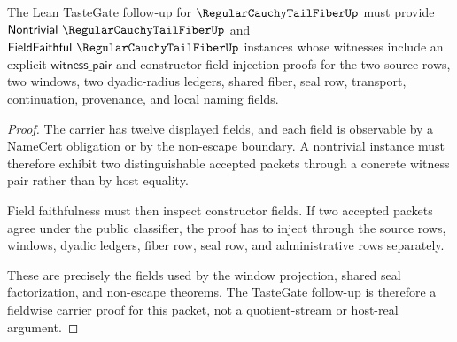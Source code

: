 \begin{theorem}
\label{thm:regular-cauchy-tail-fiber-tastegate-contract}
The Lean TasteGate follow-up for $\RegularCauchyTailFiberUp$ must provide $\mathsf{Nontrivial}\ \RegularCauchyTailFiberUp$ and $\mathsf{FieldFaithful}\ \RegularCauchyTailFiberUp$ instances whose witnesses include an explicit $\mathsf{witness\_pair}$ and constructor-field injection proofs for the two source rows, two windows, two dyadic-radius ledgers, shared fiber, seal row, transport, continuation, provenance, and local naming fields.
\end{theorem}
\begin{proof}
The carrier has twelve displayed fields, and each field is observable by a NameCert obligation or by the non-escape boundary. A nontrivial instance must therefore exhibit two distinguishable accepted packets through a concrete witness pair rather than by host equality.

Field faithfulness must then inspect constructor fields. If two accepted packets agree under the public classifier, the proof has to inject through the source rows, windows, dyadic ledgers, fiber row, seal row, and administrative rows separately.

These are precisely the fields used by the window projection, shared seal factorization, and non-escape theorems. The TasteGate follow-up is therefore a fieldwise carrier proof for this packet, not a quotient-stream or host-real argument.
\end{proof}

